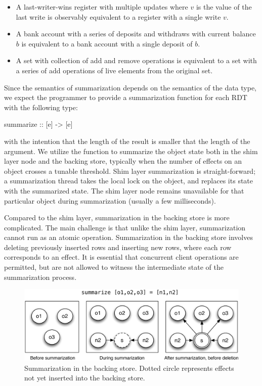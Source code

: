 \begin{itemize}
\setlength{\itemsep}{2pt}
\item A last-writer-wins register with multiple updates where $v$ is the value
of the last write is observably equivalent to a register with a single write
$v$.

\item A bank account with a series of deposits and withdraws with current
balance $b$ is equivalent to a bank account with a single deposit of $b$.

\item A set with collection of add and remove operations is equivalent to a set
with a series of add operations of live elements from the original set.
\end{itemize}

Since the semantics of summarization depends on the semantics of the data type,
we expect the programmer to provide a summarization function for each RDT with
the following type:

\begin{codehaskell}
summarize :: [e] -> [e]
\end{codehaskell}

\noindent with the intention that the length of the result is smaller that the
length of the argument. We utilize the  function to summarize the
object state both in the shim layer node and the backing store, typically when
the number of effects on an object crosses a tunable threshold. Shim layer
summarization is straight-forward; a summarization thread takes the local lock
on the object, and replaces its state with the summarized state. The shim layer
node remains unavailable for that particular object during summarization
(usually a few milliseconds).

Compared to the shim layer, summarization in the backing store is more
complicated. The main challenge is that unlike the shim layer, summarization
cannot run as an atomic operation. Summarization in the backing store involves
deleting previously inserted rows and inserting new rows, where each row
corresponds to an effect. It is essential that concurrent client operations are
permitted, but are not allowed to witness the intermediate state of the
summarization process.

\begin{figure}[t]
\begin{center}
\includegraphics[width=\columnwidth]{Figures/SumDisk}
\end{center}
\caption{Summarization in the backing store. Dotted circle represents effects not yet inserted into the backing store.}
\label{fig:impl_sum_disk}
\end{figure}

